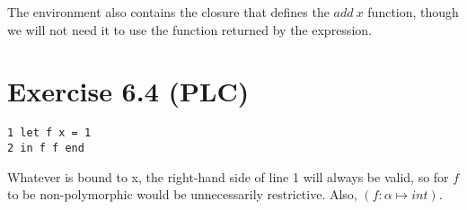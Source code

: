 \documentclass[a4paper]{article}
\newcommand{\RULE}[1]{\textsc{#1}}
\newcommand{\expr}[1]{\ensuremath{\textcolor{term}{#1}}}
\newcommand{\type}[1]{\ensuremath{\textcolor{blue}{#1}}}
\newcommand{\context}[1]{\ensuremath{\textcolor{black}{#1}}}
\newcommand{\const}[1]{\mathsf{#1}}
\newcommand{\typing}[3]{\ensuremath{#1\ \vdash\ #2\ :\ #3}}
\newcommand{\PLUS}[2]{#1\;\expr{+}\;#2}
\newcommand{\LT}[2]{#1\;\expr{<}\;#2}
\newcommand{\NUM}[1]{\expr{\const{#1}}}
\newcommand\BOOL{\type{\const{bool}}}
\newcommand{\EMPTY}{\context{\cdot}}
\begin{document}
The environment also contains the closure that defines the $add\ x$ function,
though we will not need it to use the function returned by the expression.

\section*{Exercise 6.4 (PLC)}
\begin{verbatim}
1 let f x = 1
2 in f f end
\end{verbatim}
Whatever is bound to x, the right-hand side of line 1 will always be valid, so
for $f$ to be non-polymorphic would be unnecessarily restrictive.
Also, $(f : \alpha \mapsto int)$.
\end{document}

